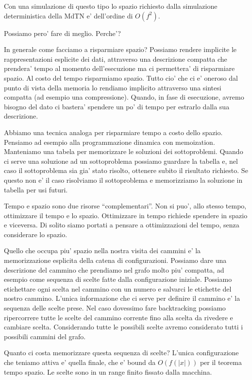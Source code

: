 Con una simulazione di questo tipo lo spazio richiesto dalla simulazione deterministica della MdTN
e' dell'ordine di $O(f^{2})$.

Possiamo pero' fare di meglio. Perche'?

In generale come facciamo a risparmiare spazio? Possiamo rendere implicite le rappresentazioni
esplicite dei dati, attraverso una descrizione compatta che prendera' tempo al momento
dell'esecuzione ma ci permettera' di risparmiare spazio. Al costo del tempo risparmiamo spazio.
Tutto cio' che ci e' oneroso dal punto di vista della memoria lo rendiamo implicito attraverso una
sintesi compatta (ad esempio una compressione). Quando, in fase di esecuzione, avremo bisogno del
dato ci bastera' spendere un po' di tempo per estrarlo dalla sua descrizione.

Abbiamo una tecnica analoga per risparmiare tempo a costo dello spazio. Pensiamo ad esempio alla
programmazione dinamica con memoization. Manteniamo una tabela per memorizzare le soluzioni dei
sottoproblemi. Quando ci serve una soluzione ad un sottoproblema possiamo guardare la tabella e, nel
caso il sottoproblema sia gia' stato risolto, ottenere subito il risultato richiesto. Se questo non
e' il caso risolviamo il sottoproblema e memorizziamo la soluzione in tabella per usi futuri.

Tempo e spazio sono due risorse ``complementari''. Non si puo', allo stesso tempo, ottimizzare il
tempo e lo spazio. Ottimizzare in tempo richiede spendere in spazio e viceversa.  Di solito siamo
portati a pensare a ottimizzazioni del tempo, senza considerare lo spazio.

Quello che occupa piu' spazio nella nostra visita dei cammini e' la memorizzazione esplicita della
catena di configurazioni. Possiamo dare una descrizione del cammino che prendiamo nel grafo molto
piu' compatta, ad esempio come sequenza di scelte fatte dalla configurazione iniziale. Possiamo
etichettare ogni scelta nel cammino con un numero e salvarci le etichette del nostro cammino.
L'unica informazione che ci serve per definire il cammino e' la sequenza delle scelte prese. Nel
caso dovessimo fare backtracking possiamo ripercorrere tutte le scelte del cammino corrente fino
alla scelta da rivedere e cambiare scelta. Considerando tutte le possibili scelte avremo considerato
tutti i possibili cammini del grafo.

Quanto ci costa memorizzare questa sequenza di scelte? L'unica configurazione che teniamo attiva e'
quella finale, che e' bound da $O(f(|x|))$ per il teorema tempo spazio. Le scelte sono in un range
finito fissato dalla macchina.

